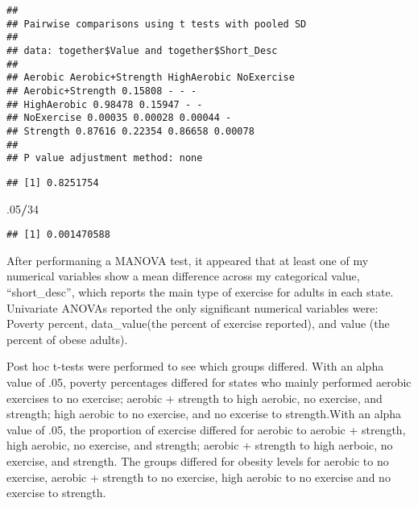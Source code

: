 \documentclass[]{article}
\newenvironment{Shaded}{\begin{snugshade}}{\end{snugshade}}
\newcommand{\CommentTok}[1]{\textcolor[rgb]{0.56,0.35,0.01}{\textit{#1}}}
\newcommand{\DecValTok}[1]{\textcolor[rgb]{0.00,0.00,0.81}{#1}}
\newcommand{\FloatTok}[1]{\textcolor[rgb]{0.00,0.00,0.81}{#1}}
\newcommand{\NormalTok}[1]{#1}
\newcommand{\OperatorTok}[1]{\textcolor[rgb]{0.81,0.36,0.00}{\textbf{#1}}}
\begin{document}
\begin{verbatim}
##
## Pairwise comparisons using t tests with pooled SD
##
## data: together$Value and together$Short_Desc
##
## Aerobic Aerobic+Strength HighAerobic NoExercise
## Aerobic+Strength 0.15808 - - -
## HighAerobic 0.98478 0.15947 - -
## NoExercise 0.00035 0.00028 0.00044 -
## Strength 0.87616 0.22354 0.86658 0.00078
##
## P value adjustment method: none
\end{verbatim}

\begin{Shaded}
\end{Shaded}

\begin{verbatim}
## [1] 0.8251754
\end{verbatim}

\begin{Shaded}
\begin{Highlighting}[]
\FloatTok{.05}\OperatorTok{/}\DecValTok{34}
\end{Highlighting}
\end{Shaded}

\begin{verbatim}
## [1] 0.001470588
\end{verbatim}

After performaning a MANOVA test, it appeared that at least one of my
numerical variables show a mean difference across my categorical value,
``short\_desc'', which reports the main type of exercise for adults in
each state. Univariate ANOVAs reported the only significant numerical
variables were: Poverty percent, data\_value(the percent of exercise
reported), and value (the percent of obese adults).

Post hoc t-tests were performed to see which groups differed. With an
alpha value of .05, poverty percentages differed for states who mainly
performed aerobic exercises to no exercise; aerobic + strength to high
aerobic, no exercise, and strength; high aerobic to no exercise, and no
excerise to strength.With an alpha value of .05, the proportion of
exercise differed for aerobic to aerobic + strength, high aerobic, no
exercise, and strength; aerobic + strength to high aerboic, no exercise,
and strength. The groups differed for obesity levels for aerobic to no
exercise, aerobic + strength to no exercise, high aerobic to no exercise
and no exercise to strength.
\end{document}
